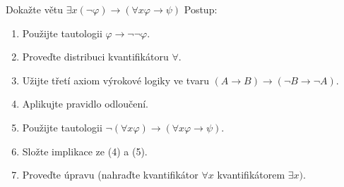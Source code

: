 Dokažte větu $\exists x(\neg \varphi) \rightarrow(\forall x \varphi \rightarrow
\psi)$ Postup:

\begin{enumerate}
  \item Použijte tautologii $\varphi \rightarrow \neg \neg \varphi$.
  \item Proveďte distribuci kvantifikátoru $\forall$.
  \item Užijte třetí axiom výrokové logiky ve tvaru $(A \rightarrow B)
  \rightarrow (\neg B \rightarrow \neg A)$.
  \item Aplikujte pravidlo odloučení.
  \item Použijte tautologii $\neg (\forall x \varphi) \rightarrow(\forall x \varphi \rightarrow
\psi)$.
  \item Složte implikace ze (4) a (5).
  \item Proveďte úpravu (nahraďte kvantifikátor $\forall x$ kvantifikátorem
  $\exists x)$.
\end{enumerate}
